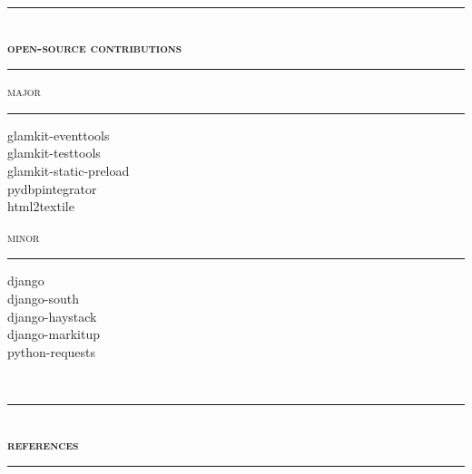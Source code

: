 \documentclass[a4paper,12pt]{article}
\begin{document}
\begin{spacing}{0.95}
\begin{minipage}[t]{95.5mm}
	\vspace{2.5mm}
	\rule[1mm]{\linewidth}{1mm}\\
	{\Large\textsc{\textbf{open-source contributions}}}\\
	\vspace{1mm}%
	\rule[1mm]{\linewidth}{1mm}
	
	\begin{minipage}[t]{45.25mm}
		{\large\textsc{major}}\\
		\vspace{-3.1mm}%
		\rule[3mm]{\linewidth}{0.25mm}
				
		{\small
		glamkit-eventtools\\
		glamkit-testtools\\
		glamkit-static-preload\\
		pydbpintegrator\\
		html2textile}
	\end{minipage}%
	\hspace{5mm}%
	\begin{minipage}[t]{45.25mm}
		{\large\textsc{minor}}\\
		\vspace{-3.1mm}%
		\rule[3mm]{\linewidth}{0.25mm}
		
		{\small
		django\\
		django-south\\
		django-haystack\\
		django-markitup\\
		python-requests}
	\end{minipage}
\end{minipage}\\
\vspace{1mm}

\rule[1mm]{\linewidth}{1mm}\\
{\Large\textsc{\textbf{references}}}\\
\rule[1mm]{\linewidth}{1mm}


\end{spacing}
\end{document}
